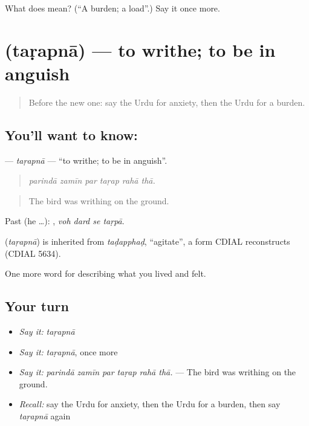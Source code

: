\begin{tcolorbox}[breakable,colback=teal!4,colframe=teal!35!black,title={Before you move on}]
What does  mean? (\textquotedblleft{}A burden; a load\textquotedblright{}.) Say it once more.
\end{tcolorbox}
\section[\texorpdfstring{\ur{تڑپنا} (taṛapnā)}{تڑپنا (taṛapnā)}]{ (taṛapnā) — to writhe; to be in anguish}

\label{lesson:UR-C446-tarapna}



\begin{quote}
Before the new one: say the Urdu for anxiety, then the Urdu for a burden.
\end{quote}

\subsection*{You'll want to know: }
\textbf{} — \emph{taṛapnā} — \textquotedblleft{}to writhe; to be in anguish\textquotedblright{}.

\begin{quote}
     
\end{quote}

\begin{quote}
\emph{parindā zamīn par taṛap rahā thā.}
\end{quote}

\begin{quote}
The bird was writhing on the ground.
\end{quote}

Past (he …):    , \emph{voh dard se taṛpā}.

\begin{cousinweb}
\textbf{} (\emph{taṛapnā}) is inherited from \emph{taḍapphaḍ}, \textquotedblleft{}agitate\textquotedblright{}, a form CDIAL reconstructs (CDIAL 5634).
\end{cousinweb}

\begin{grammarlens}[title={What you've built}]
One more word for describing what you lived and felt.
\end{grammarlens}

\subsection*{Your turn}
\begin{itemize}
\raggedright
  \item \emph{Say it:} \emph{taṛapnā}
  \item \emph{Say it:} \emph{taṛapnā}, once more
  \item \emph{Say it:} \emph{parindā zamīn par taṛap rahā thā.} — The bird was writhing on the ground.
  \item \emph{Recall:} say the Urdu for anxiety, then the Urdu for a burden, then say \emph{taṛapnā} again
\end{itemize}

